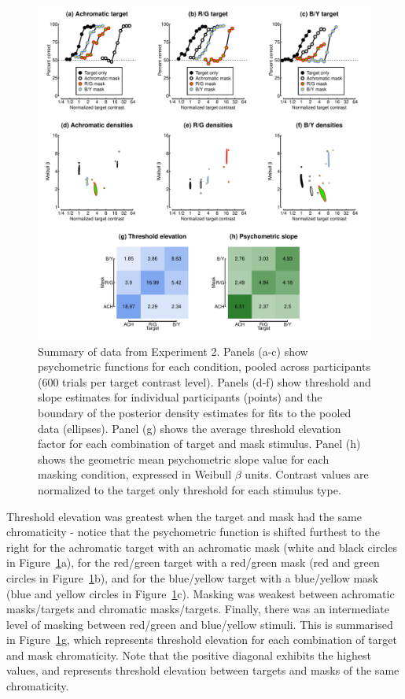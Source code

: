 \documentclass[
  letterpaper,
  DIV=11,
  numbers=noendperiod]{scrartcl}
\begin{document}
\begin{figure}

{\centering \includegraphics{Figures/MCSdata.pdf}

}

\caption{\label{fig-MCSfig}Summary of data from Experiment 2. Panels
(a-c) show psychometric functions for each condition, pooled across
participants (600 trials per target contrast level). Panels (d-f) show
threshold and slope estimates for individual participants (points) and
the boundary of the posterior density estimates for fits to the pooled
data (ellipses). Panel (g) shows the average threshold elevation factor
for each combination of target and mask stimulus. Panel (h) shows the
geometric mean psychometric slope value for each masking condition,
expressed in Weibull \(\beta\) units. Contrast values are normalized to
the target only threshold for each stimulus type.}

\end{figure}

Threshold elevation was greatest when the target and mask had the same
chromaticity - notice that the psychometric function is shifted furthest
to the right for the achromatic target with an achromatic mask (white
and black circles in Figure~\ref{fig-MCSfig}a), for the red/green target
with a red/green mask (red and green circles in
Figure~\ref{fig-MCSfig}b), and for the blue/yellow target with a
blue/yellow mask (blue and yellow circles in Figure~\ref{fig-MCSfig}c).
Masking was weakest between achromatic masks/targets and chromatic
masks/targets. Finally, there was an intermediate level of masking
between red/green and blue/yellow stimuli. This is summarised in
Figure~\ref{fig-MCSfig}g, which represents threshold elevation for each
combination of target and mask chromaticity. Note that the positive
diagonal exhibits the highest values, and represents threshold elevation
between targets and masks of the same chromaticity.
\end{document}
